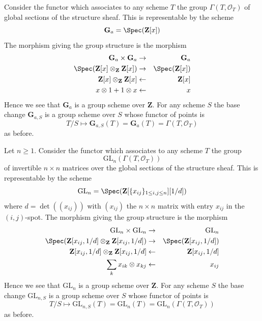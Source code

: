 \begin{example}
\label{example-additive-group}
Consider the functor which associates
to any scheme $T$ the group $\Gamma(T, \mathcal{O}_T)$
of global sections of the structure sheaf.
This is representable by the scheme
$$
\mathbf{G}_a = \Spec(\mathbf{Z}[x])
$$
The morphism giving the group structure is the morphism
\begin{eqnarray*}
\mathbf{G}_a \times \mathbf{G}_a & \to & \mathbf{G}_a \\
\Spec(\mathbf{Z}[x] \otimes_{\mathbf{Z}} \mathbf{Z}[x])
& \to &
\Spec(\mathbf{Z}[x]) \\
\mathbf{Z}[x] \otimes_{\mathbf{Z}} \mathbf{Z}[x]
& \leftarrow &
\mathbf{Z}[x] \\
x \otimes 1 + 1 \otimes x & \leftarrow & x
\end{eqnarray*}
Hence we see that $\mathbf{G}_a$ is a group scheme over $\mathbf{Z}$.
For any scheme $S$ the base change $\mathbf{G}_{a, S}$ is a
group scheme over $S$ whose functor of points is
$$
T/S
\longmapsto
\mathbf{G}_{a, S}(T) = \mathbf{G}_a(T) = \Gamma(T, \mathcal{O}_T)
$$
as before.
\end{example}

\begin{example}
\label{example-general-linear-group}
Let $n \geq 1$.
Consider the functor which associates
to any scheme $T$ the group
$$
\text{GL}_n(\Gamma(T, \mathcal{O}_T))
$$
of invertible $n \times n$ matrices over
the global sections of the structure sheaf.
This is representable by the scheme
$$
\text{GL}_n = \Spec(\mathbf{Z}[\{x_{ij}\}_{1 \leq i, j \leq n}][1/d])
$$
where $d = \det((x_{ij}))$ with $(x_{ij})$ the $n \times n$ matrix
with entry $x_{ij}$ in the $(i, j)$-spot.
The morphism giving the group structure is the morphism
\begin{eqnarray*}
\text{GL}_n \times \text{GL}_n & \to & \text{GL}_n \\
\Spec(\mathbf{Z}[x_{ij}, 1/d] \otimes_{\mathbf{Z}}
\mathbf{Z}[x_{ij}, 1/d])
& \to &
\Spec(\mathbf{Z}[x_{ij}, 1/d]) \\
\mathbf{Z}[x_{ij}, 1/d] \otimes_{\mathbf{Z}} \mathbf{Z}[x_{ij}, 1/d]
& \leftarrow &
\mathbf{Z}[x_{ij}, 1/d] \\
\sum_k x_{ik} \otimes x_{kj} & \leftarrow & x_{ij}
\end{eqnarray*}
Hence we see that $\text{GL}_n$ is a group scheme over $\mathbf{Z}$.
For any scheme $S$ the base change $\text{GL}_{n, S}$ is a
group scheme over $S$ whose functor of points is
$$
T/S
\longmapsto
\text{GL}_{n, S}(T) = \text{GL}_n(T) =\text{GL}_n(\Gamma(T, \mathcal{O}_T))
$$
as before.
\end{example}


